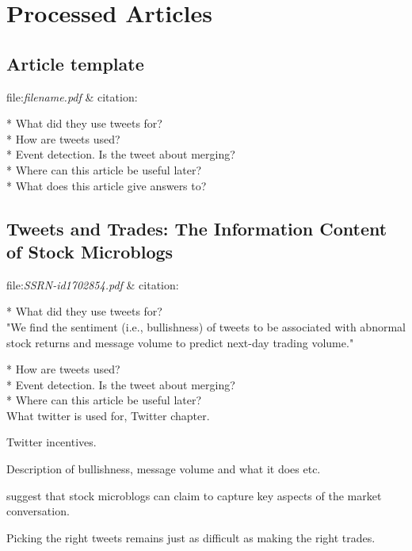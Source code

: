 \chapter{Processed Articles}

\section{Article template}
file:\textit{filename.pdf} & citation:\cite[]{}  

* What did they use tweets for?\\
* How are tweets used?\\
* Event detection. Is the tweet about merging? \\
* Where can this article be useful later? \\
* What does this article give answers to?\\


\section{Tweets and Trades: The Information Content of Stock Microblogs}
file:\textit{SSRN-id1702854.pdf} & citation:\cite[]{sprenger10} %

* What did they use tweets for?\\
"We find the sentiment (i.e., bullishness) of tweets to be associated with abnormal
stock returns and message volume to predict next-day trading volume."
\cite[]{sprenger10} 

* How are tweets used?\\

* Event detection. Is the tweet about merging? \\

* Where can this article be useful later? \\
What twitter is used for, Twitter chapter. 

Twitter incentives. \cite[p4]{sprenger10}

Description of bullishness, message volume and what it does etc. 

\cite[p52]{sprenger10} suggest that stock microblogs can claim to capture key aspects of the market
conversation.

Picking the right tweets remains just as difficult as making the
right trades.


